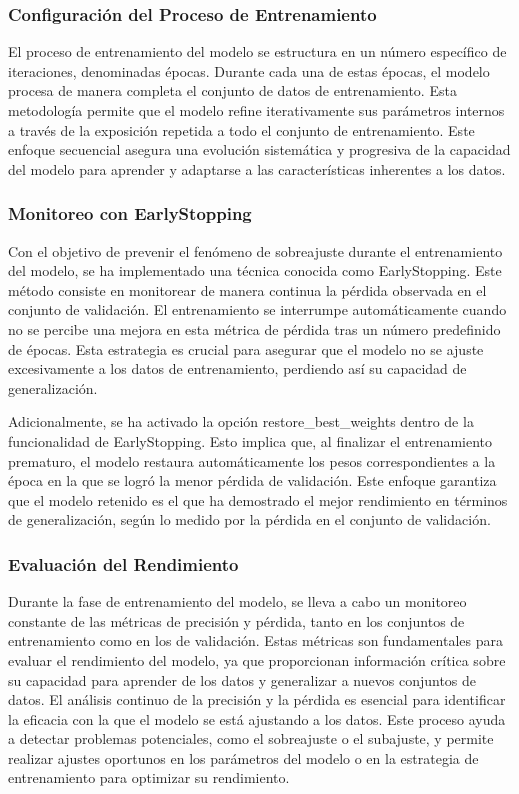 \subsubsection{Configuración del Proceso de Entrenamiento} 

El proceso de entrenamiento del modelo se estructura en un número específico de iteraciones, denominadas épocas. Durante cada una de estas épocas, el modelo procesa de manera completa el conjunto de datos de entrenamiento. Esta metodología permite que el modelo refine iterativamente sus parámetros internos a través de la exposición repetida a todo el conjunto de entrenamiento. Este enfoque secuencial asegura una evolución sistemática y progresiva de la capacidad del modelo para aprender y adaptarse a las características inherentes a los datos.

\subsubsection{Monitoreo con EarlyStopping} 
Con el objetivo de prevenir el fenómeno de sobreajuste durante el entrenamiento del modelo, se ha implementado una técnica conocida como EarlyStopping. Este método consiste en monitorear de manera continua la pérdida observada en el conjunto de validación. El entrenamiento se interrumpe automáticamente cuando no se percibe una mejora en esta métrica de pérdida tras un número predefinido de épocas. Esta estrategia es crucial para asegurar que el modelo no se ajuste excesivamente a los datos de entrenamiento, perdiendo así su capacidad de generalización.

Adicionalmente, se ha activado la opción restore\_best\_weights dentro de la funcionalidad de EarlyStopping. Esto implica que, al finalizar el entrenamiento prematuro, el modelo restaura automáticamente los pesos correspondientes a la época en la que se logró la menor pérdida de validación. Este enfoque garantiza que el modelo retenido es el que ha demostrado el mejor rendimiento en términos de generalización, según lo medido por la pérdida en el conjunto de validación.


\subsubsection{Evaluación del Rendimiento} 
Durante la fase de entrenamiento del modelo, se lleva a cabo un monitoreo constante de las métricas de precisión y pérdida, tanto en los conjuntos de entrenamiento como en los de validación. Estas métricas son fundamentales para evaluar el rendimiento del modelo, ya que proporcionan información crítica sobre su capacidad para aprender de los datos y generalizar a nuevos conjuntos de datos. El análisis continuo de la precisión y la pérdida es esencial para identificar la eficacia con la que el modelo se está ajustando a los datos. Este proceso ayuda a detectar problemas potenciales, como el sobreajuste o el subajuste, y permite realizar ajustes oportunos en los parámetros del modelo o en la estrategia de entrenamiento para optimizar su rendimiento.

